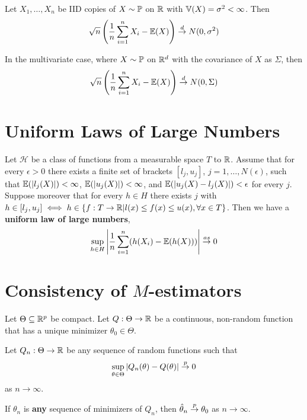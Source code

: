 \begin{thm}
  \label{defn:stochastic_convergence_concepts:2}
  Let $X_{1}, \dots, X_{n}$ be IID copies of $X \sim \Prob$ on $\mathbb{R}$
  with $\Var{X} = \sigma^{2} < \infty$. Then
  \begin{equation}
    \label{eq:19}
    \sqrt{n}\left(\frac{1}{n} \sum_{i=1}^{n} X_{i} - \E{X}\right) \cd N(0, \sigma^{2})
  \end{equation}

  In the multivariate case, where $X \sim \Prob$ on $\mathbb{R}^{d}$ with the
  covariance of $X$ as $\Sigma$, then
  \begin{equation}
    \label{eq:21}
    \sqrt{n} \left(\frac{1}{n} \sum_{i=1}^{n} X_{i} - \E{X}\right) \cd N(0, \Sigma)
  \end{equation}
\end{thm}

\section{Uniform Laws of Large Numbers}
\label{sec:uniform-laws-large}

\begin{thm}
  Let $\mathcal{H}$ be a class of functions from a measurable space
  $T$ to $\mathbb{R}$. Assume that for every $\epsilon > 0$ there exists a
  finite set of brackets $[l_{j}, u_{j}]$, $j = 1, \dots,
  N(\epsilon)$, such that $\E{|l_{j}(X)|} < \infty$, $\E{|u_{j}(X)|} <
  \infty$, and $\E{|u_{j}(X) - l_{j}(X)|} < \epsilon$ for every $j$.
  Suppose moreover that for every $h \in H$ there exists $j$ with $h
  \in [l_{j}, u_{j}] \iff h \in \{ f: T \rightarrow \mathbb{R} | l(x) \leq
  f(x) \leq u(x), \forall x \in T \}$. Then we have a \textbf{uniform
    law of large numbers},
  \begin{equation}
    \label{eq:1}
    \sup_{h \in H} \left| \frac{1}{n} \sum_{i=1}^{n} (h(X_{i}) -
      \E{h(X)}) \right| \cas 0
  \end{equation}
\end{thm}

\section{Consistency of $M$-estimators}
\label{sec:cons-m-estim}

\begin{thm}
  \label{defn:parametric_statistical_models:1}
  Let $\Theta \subseteq \mathbb{R}^{p}$ be compact.  Let $Q: \Theta
  \rightarrow \mathbb{R}$ be a continuous, non-random function that has a
  unique minimizer $\theta_{0} \in \Theta$.

  Let $Q_{n}: \Theta \rightarrow \mathbb{R}$ be any sequence of random
  functions such that
  \begin{equation}
    \label{eq:32}
    \sup_{\theta \in \Theta} |Q_{n}(\theta) - Q(\theta)| \overset{p}{\rightarrow} 0
  \end{equation} as $n \rightarrow \infty$.

  If $\theta_{n}$ is \textbf{any} sequence of minimizers of $Q_{n}$,
  then $\hat \theta_{n} \overset{p}{\rightarrow} \theta_{0}$ as $n \rightarrow \infty$.
\end{thm}

